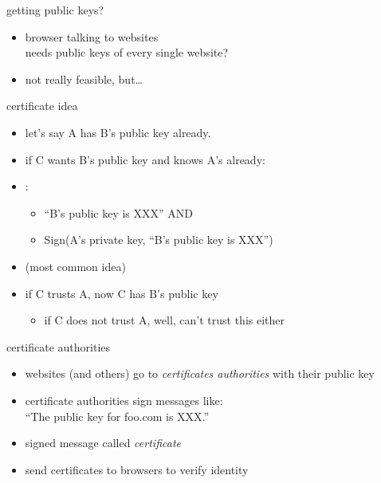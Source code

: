 \begin{frame}{getting public keys?}
    \begin{itemize}
    \item browser talking to websites \\
    needs public keys of every single website?
    \vspace{.5cm}
    \item not really feasible, but\ldots
    \end{itemize}
\end{frame}

\begin{frame}{certificate idea}
    \begin{itemize}
        \item let's say A has B's public key already.
        \item if C wants B's public key and knows A's already:
            \vspace{.5cm}
        \item {}:
            \begin{itemize}
            \item ``B's public key is XXX'' AND
            \item Sign(A's private key, ``B's public key is XXX'')
            \end{itemize}
        \item {} (most common idea)
        \item if C trusts A, now C has B's public key
            \begin{itemize}
            \item if C does not trust A, well, can't trust this either
            \end{itemize}
    \end{itemize}
\end{frame}

\begin{frame}{certificate authorities}
    \begin{itemize}
    \item websites (and others) go to \textit{certificates authorities} with their public key
    \item certificate authorities sign messages like: \\
        ``The public key for foo.com is XXX.''
    \item signed message called \textit{certificate}
    \item send certificates to browsers to verify identity
    \end{itemize}
\end{frame}

